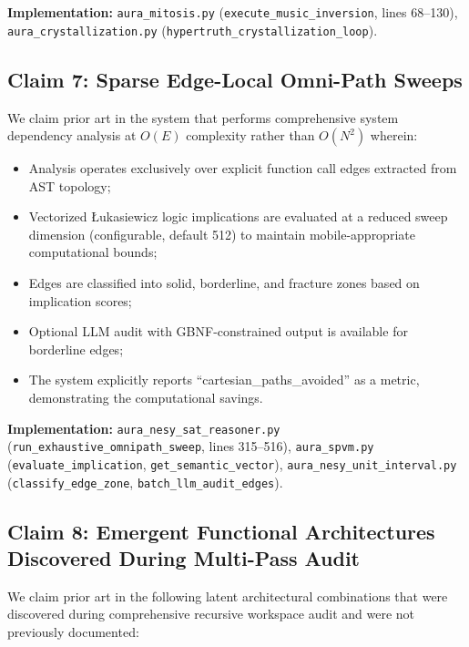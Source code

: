 \documentclass[11pt]{article}
\begin{document}
\textbf{Implementation:} \texttt{aura\_mitosis.py} (\texttt{execute\_music\_inversion}, lines 68--130), \texttt{aura\_crystallization.py} (\texttt{hypertruth\_crystallization\_loop}).

\subsection{Claim 7: Sparse Edge-Local Omni-Path Sweeps}

We claim prior art in the system that performs comprehensive system dependency analysis at $O(E)$ complexity rather than $O(N^2)$ wherein:
\begin{itemize}
    \item Analysis operates exclusively over explicit function call edges extracted from AST topology;
    \item Vectorized Łukasiewicz logic implications are evaluated at a reduced sweep dimension (configurable, default 512) to maintain mobile-appropriate computational bounds;
    \item Edges are classified into solid, borderline, and fracture zones based on implication scores;
    \item Optional LLM audit with GBNF-constrained output is available for borderline edges;
    \item The system explicitly reports ``cartesian\_paths\_avoided'' as a metric, demonstrating the computational savings.
\end{itemize}

\textbf{Implementation:} \texttt{aura\_nesy\_sat\_reasoner.py} (\texttt{run\_exhaustive\_omnipath\_sweep}, lines 315--516), \texttt{aura\_spvm.py} (\texttt{evaluate\_implication}, \texttt{get\_semantic\_vector}), \texttt{aura\_nesy\_unit\_interval.py} (\texttt{classify\_edge\_zone}, \texttt{batch\_llm\_audit\_edges}).

\subsection{Claim 8: Emergent Functional Architectures Discovered During Multi-Pass Audit}

We claim prior art in the following latent architectural combinations that were discovered during comprehensive recursive workspace audit and were not previously documented:
\end{document}
